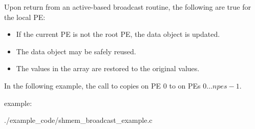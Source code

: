 \begin{apidefinition}
{\begin{DeprecateBlock}
    Upon return from an active-based broadcast routine, the following are true for the local
    \ac{PE}:
    \begin{itemize}
      \item If the current PE is not the root PE, the \dest{} data object is updated.
      \item The \source{} data object may be safely reused.
      \item The values in the  array are restored to the
        original values.
    \end{itemize}
\end{DeprecateBlock}
}




\begin{apiexamples}

\apicexample
    {In the following \Cstd[11] example, the call to  copies \source{}
    on \ac{PE} $0$ to \dest{} on \acp{PE} $0\dots npes-1$.

    \CorCpp{} example:}
    {./example_code/shmem_broadcast_example.c}
    {}

\end{apiexamples}

\end{apidefinition}
